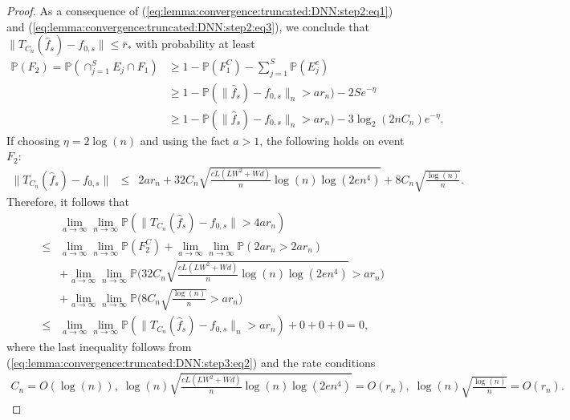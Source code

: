 \documentclass[11pt, preprint]{imsart}
\numberwithin{equation}{section}
\def \pr{\mathbb{P}}
\theoremstyle{plain}
\theoremstyle{definition}
\begin{document}
\begin{proof}
As a consequence of (\ref{eq:lemma:convergence:truncated:DNN:step2:eq1}) and (\ref{eq:lemma:convergence:truncated:DNN:step2:eq3}), we conclude that $\|T_{C_n}(\widehat{f}_s)-f_{0,s}\|\leq \bar{r}_*$ with probability at least
\begin{align}
	\pr(F_2)=\pr(\cap_{j=1}^SE_j\cap F_1)&\geq 1-\pr(F_1^C)-\sum_{j=1}^S\pr(E_j^c)\nonumber\\
	&\geq 1-\pr(\|\widehat{f}_s)-f_{0,s}\|_n> ar_n)-2Se^{-\eta}\nonumber\\
	&\geq 1-\pr(\|\widehat{f}_s)-f_{0,s}\|_n> ar_n)-3\log_2(2nC_n)e^{-\eta}. \label{eq:lemma:convergence:truncated:DNN:step3:eq2}
\end{align}
If choosing $\eta=2\log(n)$ and using the fact $a>1$, the following holds on event $F_2$:
\begin{eqnarray}
	\|T_{C_n}(\widehat{f}_s)-f_{0,s}\|&\leq& 2ar_n+32C_n\sqrt{\frac{cL(LW^2+Wd)}{n}\log(n)\log(2en^4)}+8C_n\sqrt{\frac{\log(n)}{n}}.\nonumber
\end{eqnarray}
Therefore, it follows that 
\begin{eqnarray}
	&&\lim_{a\to\infty}\lim_{n\to\infty}\pr(\|T_{C_n}(\widehat{f}_s)-f_{0,s}\|>4ar_n)\nonumber\\&\leq&\lim_{a\to\infty}\lim_{n\to\infty}\pr(F_2^C)+\lim_{a\to\infty}\lim_{n\to\infty}\pr(2ar_n>2ar_n)\nonumber\\
	&&+\lim_{a\to\infty}\lim_{n\to\infty}\pr\bigg(32C_n\sqrt{\frac{cL(LW^2+Wd)}{n}\log(n)\log(2en^4)}>ar_n\bigg)\nonumber\\
	&&+\lim_{a\to\infty}\lim_{n\to\infty}\pr\bigg(8C_n\sqrt{\frac{\log(n)}{n}}>ar_n\bigg)\nonumber\\
	&\leq&  \lim_{a\to\infty}\lim_{n\to\infty}\pr(\|T_{C_n}(\widehat{f}_s)-f_{0,s}\|_n> ar_n)+0+0+0=0,\nonumber
\end{eqnarray}
where the last inequality follows from (\ref{eq:lemma:convergence:truncated:DNN:step3:eq2}) and the rate conditions
 \begin{eqnarray}
	C_n=O(\log(n)),\; \log(n)\sqrt{\frac{cL(LW^2+Wd)}{n}\log(n)\log(2en^4)}=O(r_n),\;\log(n)\sqrt{\frac{\log(n)}{n}}=O(r_n).\nonumber
\end{eqnarray}
%
\end{proof}
\end{document}
